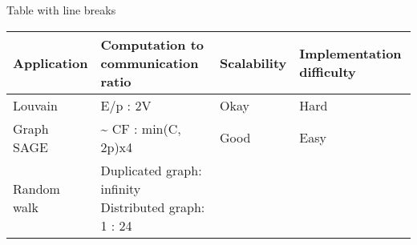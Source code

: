 \documentclass[10pt,oneside]{memoir}
\begin{document}
Table with line breaks

\begin{longtable}[]{@{}llll@{}}
\toprule
\begin{minipage}[b]{0.28\columnwidth}\raggedright
Application\strut
\end{minipage} & \begin{minipage}[b]{0.35\columnwidth}\raggedright
Computation to communication ratio\strut
\end{minipage} & \begin{minipage}[b]{0.13\columnwidth}\raggedright
Scalability\strut
\end{minipage} & \begin{minipage}[b]{0.13\columnwidth}\raggedright
Implementation difficulty\strut
\end{minipage}\tabularnewline
\midrule
\endhead
\begin{minipage}[t]{0.28\columnwidth}\raggedright
Louvain\strut
\end{minipage} & \begin{minipage}[t]{0.35\columnwidth}\raggedright
E/p : 2V\strut
\end{minipage} & \begin{minipage}[t]{0.13\columnwidth}\raggedright
Okay\strut
\end{minipage} & \begin{minipage}[t]{0.13\columnwidth}\raggedright
Hard\strut
\end{minipage}\tabularnewline
\begin{minipage}[t]{0.28\columnwidth}\raggedright
Graph SAGE\strut
\end{minipage} & \begin{minipage}[t]{0.35\columnwidth}\raggedright
\textasciitilde{} CF : min(C, 2p)x4\strut
\end{minipage} & \begin{minipage}[t]{0.13\columnwidth}\raggedright
Good\strut
\end{minipage} & \begin{minipage}[t]{0.13\columnwidth}\raggedright
Easy\strut
\end{minipage}\tabularnewline
\begin{minipage}[t]{0.28\columnwidth}\raggedright
Random walk\strut
\end{minipage} & \begin{minipage}[t]{0.35\columnwidth}\raggedright
Duplicated graph: infinity Distributed graph: 1 : 24\strut
\end{minipage} & \begin{minipage}[t]{0.13\columnwidth}\raggedright

\end{minipage}
\end{longtable}
\end{document}

